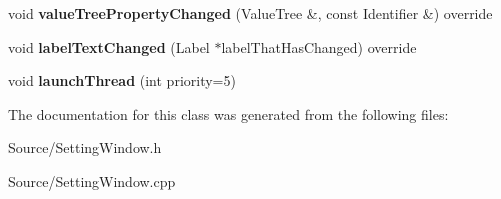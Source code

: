 \begin{DoxyCompactItemize}
\mbox{\label{class_setting_window_ade213f3fa09f21aef73a9ed7dd605869}} 
void {\bfseries value\+Tree\+Property\+Changed} (Value\+Tree \&, const Identifier \&) override
\item 
\mbox{\label{class_setting_window_a25e6d3bd0c5cdb4885f2822b36841944}} 
void {\bfseries label\+Text\+Changed} (Label $\ast$label\+That\+Has\+Changed) override
\item 
\mbox{\label{class_setting_window_a57ab286088f996dff8bbaf1b7810d835}} 
void {\bfseries launch\+Thread} (int priority=5)
\end{DoxyCompactItemize}


The documentation for this class was generated from the following files\+:\begin{DoxyCompactItemize}
\item 
Source/Setting\+Window.\+h\item 
Source/Setting\+Window.\+cpp\end{DoxyCompactItemize}
